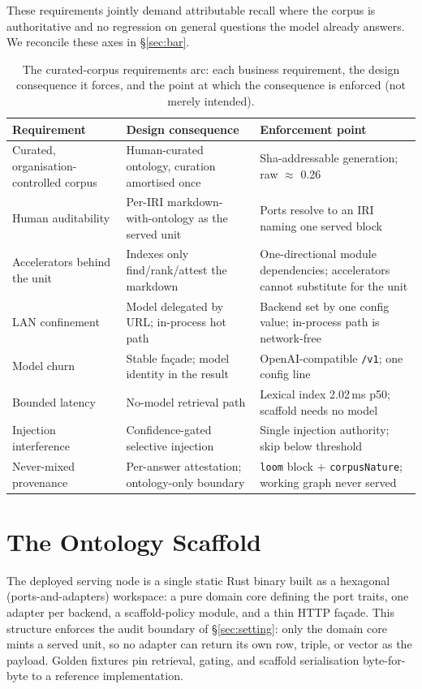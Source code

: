 \documentclass[10pt,twocolumn]{article}
\begin{document}
These requirements jointly demand attributable recall where the corpus is authoritative and no regression on general questions the model already answers. We reconcile these axes in \S\ref{sec:bar}.

\begin{table}[t]\centering\small
\caption{The curated-corpus requirements arc: each business requirement, the design consequence it
forces, and the point at which the consequence is enforced (not merely intended).}
\label{tab:req}
\renewcommand{\arraystretch}{1.15}
\begin{tabularx}{\textwidth}{@{}>{\raggedright\arraybackslash}p{3.4cm} >{\raggedright\arraybackslash}X >{\raggedright\arraybackslash}p{4.3cm}@{}}
\toprule
Requirement & Design consequence & Enforcement point \\
\midrule
Curated, organisation-controlled corpus & Human-curated ontology, curation amortised once & Sha-addressable generation; raw $\approx$ 0.26 \\
Human auditability & Per-IRI markdown-with-ontology as the served unit & Ports resolve to an IRI naming one served block \\
Accelerators behind the unit & Indexes only find/rank/attest the markdown & One-directional module dependencies; accelerators cannot substitute for the unit \\
LAN confinement & Model delegated by URL; in-process hot path & Backend set by one config value; in-process path is network-free \\
Model churn & Stable façade; model identity in the result & OpenAI-compatible \texttt{/v1}; one config line \\
Bounded latency & No-model retrieval path & Lexical index 2.02\,ms p50; scaffold needs no model \\
Injection interference & Confidence-gated selective injection & Single injection authority; skip below threshold \\
Never-mixed provenance & Per-answer attestation; ontology-only boundary & \texttt{loom} block $+$ \texttt{corpusNature}; working graph never served \\
\bottomrule
\end{tabularx}
\end{table}


\section{The Ontology Scaffold}\label{sec:system}
The deployed serving node is a single static Rust binary built as a hexagonal (ports-and-adapters) workspace: a pure domain core defining the port traits, one adapter per backend, a scaffold-policy module, and a thin HTTP façade. This structure enforces the audit boundary of \S\ref{sec:setting}: only the domain core mints a served unit, so no adapter can return its own row, triple, or vector as the payload. Golden fixtures pin retrieval, gating, and scaffold serialisation byte-for-byte to a reference implementation.
\end{document}
